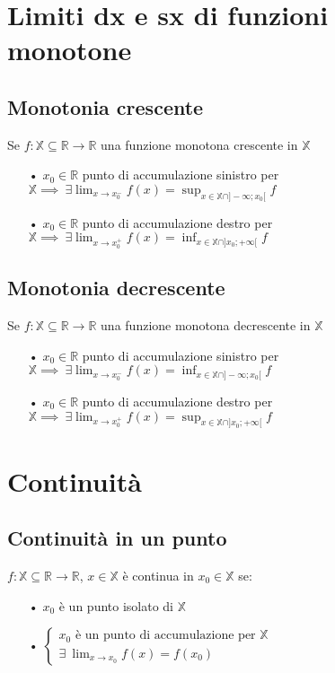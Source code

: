 \section{Limiti dx e sx di funzioni monotone}
\subsection{Monotonia crescente}
Se $f: \mathbb{X} \subseteq \mathbb{R} \to \mathbb{R}$ una funzione monotona crescente in $\mathbb{X}$
\begin{enumerate}
\item[•] $x_0 \in \mathbb{R}$ punto di accumulazione sinistro per $\mathbb{X} \implies\ \exists \displaystyle \lim_{x \to x_0^-}f(x) = \sup_{x \in \mathbb{X} \cap ]-\infty;x_0[}f$
\item[•] $x_0 \in \mathbb{R}$ punto di accumulazione destro per $\mathbb{X} \implies\ \exists \displaystyle \lim_{x \to x_0^+}f(x) = \inf_{x \in \mathbb{X} \cap ]x_0;+\infty[}f$
\end{enumerate} 
\subsection{Monotonia decrescente}
Se $f: \mathbb{X} \subseteq \mathbb{R} \to \mathbb{R}$ una funzione monotona decrescente in $\mathbb{X}$
\begin{enumerate}
\item[•] $x_0 \in \mathbb{R}$ punto di accumulazione sinistro per $\mathbb{X} \implies\ \exists \displaystyle \lim_{x \to x_0^-}f(x) = \inf_{x \in \mathbb{X} \cap ]-\infty;x_0[}f$
\item[•] $x_0 \in \mathbb{R}$ punto di accumulazione destro per $\mathbb{X} \implies\ \exists \displaystyle \lim_{x \to x_0^+}f(x) = \sup_{x \in \mathbb{X} \cap ]x_0;+\infty[}f$
\end{enumerate} 

\section{Continuità}
\subsection{Continuità in un punto}
$f:\mathbb{X} \subseteq \mathbb{R} \to \mathbb{R}$, $x \in \mathbb{X}$ è continua in $x_0 \in \mathbb{X}$ se:
\begin{enumerate}
\item[•]$x_0$ è un punto isolato di $\mathbb{X}$
\item[•]$
\begin{cases}
x_0 \text{ è un punto di accumulazione per }\mathbb{X}\\
\exists\ \displaystyle \lim_{x \to x_0}f(x) = f(x_0)
\end{cases}$
\end{enumerate}
